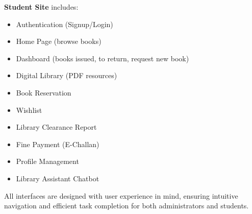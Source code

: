 \documentclass[12pt,a4paper]{report}
\begin{document}
\textbf{Student Site} includes:
\begin{itemize}[leftmargin=*]
    \item Authentication (Signup/Login)
    \item Home Page (browse books)
    \item Dashboard (books issued, to return, request new book)
    \item Digital Library (PDF resources)
    \item Book Reservation
    \item Wishlist
    \item Library Clearance Report
    \item Fine Payment (E-Challan)
    \item Profile Management
    \item Library Assistant Chatbot
\end{itemize}

All interfaces are designed with user experience in mind, ensuring intuitive navigation and efficient task completion for both administrators and students.

\newpage

\end{document}
